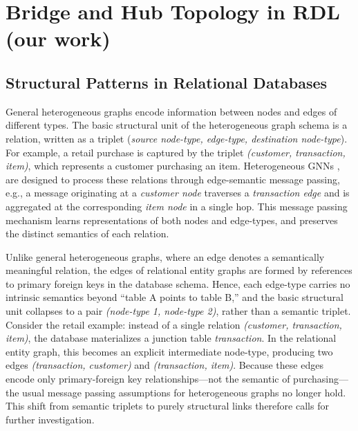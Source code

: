\documentclass{article}
\theoremstyle{plain}
\theoremstyle{definition}
\theoremstyle{remark}
\begin{document}
\section{Bridge and Hub Topology in RDL (our work)}
\label{sec: analysis}
\subsection{Structural Patterns in Relational Databases}\label{sec: structural-patterns}

   General heterogeneous graphs encode information between nodes and edges of different types. The basic structural unit of the heterogeneous graph schema is a relation, written as a triplet (\textit{source node-type, edge-type, destination node-type}). For example, a retail purchase is captured by the triplet \textit{(customer, transaction, item)}, which represents a customer purchasing an item. Heterogeneous GNNs \cite{schlichtkrull2018relational,hu2020heterogeneous}, are designed to process these relations through edge-semantic message passing, e.g., a message originating at a \textit{customer node} traverses a \textit{transaction edge} and is aggregated at the corresponding \textit{item node} in a single hop. This message passing mechanism learns representations of both nodes and edge-types, and preserves the distinct semantics of each relation. 


\vspace{-5pt}
  Unlike general heterogeneous graphs, where an edge denotes a semantically meaningful relation, the edges of relational entity graphs are formed by references to primary foreign keys in the database schema. Hence, each edge-type carries no intrinsic semantics beyond “table A points to table B,”  and the basic structural unit collapses to a pair \textit{(node-type 1, node-type 2)}, rather than a semantic triplet. Consider the retail example: instead of a single relation \textit{(customer, transaction, item)}, the database materializes a junction table \textit{transaction}. In the relational entity graph, this becomes an explicit intermediate node-type, producing two edges \textit{(transaction, customer)} and \textit{(transaction, item)}. Because these edges encode only primary-foreign key relationships—not the semantic of purchasing—the usual message passing assumptions for heterogeneous graphs no longer hold. This shift from semantic triplets to purely structural links therefore calls for further investigation.
\end{document}

